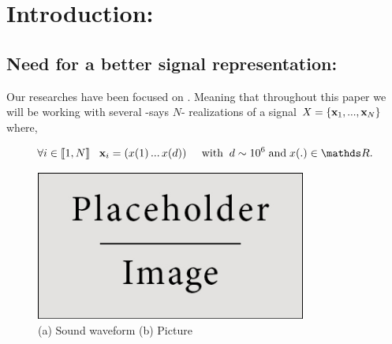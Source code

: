 \documentclass[a4paper,11pt]{report}
\begin{document}
	\vfill	
		
	\newpage
	\thispagestyle{empty}
	\mbox{}
 
	\setcounter{tocdepth}{3}
	\renewcommand{\contentsname}{Contents:}
	\tableofcontents
	\clearpage

	\renewcommand{\listfigurename}{List of figures:}
	\listoffigures

\chapter{Introduction:}
	\label{chap:Intro}
		   
	\section{Need for a better signal representation:}
		\label{seq:Intro/Need}
		
		Our researches have been focused on . Meaning that throughout this paper we will be working with several -says $N$- realizations of a signal $X =\{{\bf x}_{1}, ... , {\bf x}_{N}\}$  where,
			
		\begin{equation*}
			\forall i \in \llbracket 1 , N \rrbracket \;\;\; \bfx_{i}=(x(1) \, ... \, x(d)) \;\;\;\;\; \text{with} \;\; d \sim 10^{6} \; \text{and} \; x(.) \in \dsR.  
		\end{equation*}
		
		\begin{figure}
			\begin{center}
				\includegraphics[width=3.5in]{placeholder.jpg}
			  \caption[High dimensional signals]{(a) Sound waveform (b) Picture}
			  \label{fig:highDim signals}
			\end{center}
		\end{figure}
		
\end{document}

